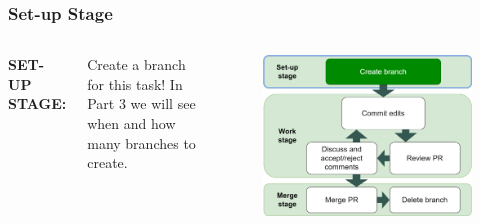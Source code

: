 \documentclass[aspectratio=169]{beamer}
\begin{document}
\begin{frame}
	\frametitle{Set-up Stage}
	\begin{columns}[c]


		\Large \textbf{SET-UP STAGE:}
		\vspace{.8em}
	
		\normalsize
		Create a branch for this task!
		\vspace{.5cm}\newline
		In Part 3 we will see when and how many branches to create.
		\vspace{.5cm}\newline
		
		\vspace{-.25cm}
		\begin{figure}
			\centering
			\includegraphics[width=\textwidth]{./img/branch-pr-merge-cycle-S1a.png}
		\end{figure}

	\end{columns}
\end{frame}
\end{document}
